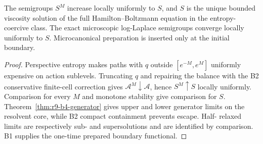 \begin{theorem}
\label{thm:r9-b4-main}
The semigroups $S^M$ increase locally uniformly to $S$, and $S$ is the unique
bounded viscosity solution of the full Hamilton--Boltzmann equation in the
entropy-coercive class.  The exact microscopic log-Laplace semigroups converge
locally uniformly to $S$.  Microcanonical preparation is inserted only at the
initial boundary.
\end{theorem}

\begin{proof}
Perspective entropy makes paths with $q$ outside
$[e^{-M},e^M]$ uniformly expensive on action sublevels.  Truncating $q$ and
repairing the balance with the B2 conservative finite-cell correction gives
$\mathcal A^M\downarrow\mathcal A$, hence $S^M\uparrow S$ locally uniformly.
Comparison for every $M$ and monotone stability give comparison for $S$.
Theorem~\ref{thm:r9-b4-generator} gives upper and lower generator limits on
the resolvent core, while B2 compact containment prevents escape.  Half-
relaxed limits are respectively sub- and supersolutions and are identified by
comparison.  B1 supplies the one-time prepared boundary functional.
\end{proof}
